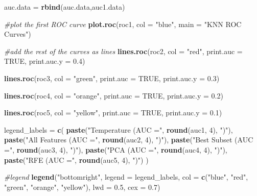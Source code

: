 \documentclass[
]{article}
\newenvironment{Shaded}{\begin{snugshade}}{\end{snugshade}}
\newcommand{\AttributeTok}[1]{\textcolor[rgb]{0.13,0.29,0.53}{#1}}
\newcommand{\CommentTok}[1]{\textcolor[rgb]{0.56,0.35,0.01}{\textit{#1}}}
\newcommand{\ConstantTok}[1]{\textcolor[rgb]{0.56,0.35,0.01}{#1}}
\newcommand{\DecValTok}[1]{\textcolor[rgb]{0.00,0.00,0.81}{#1}}
\newcommand{\FloatTok}[1]{\textcolor[rgb]{0.00,0.00,0.81}{#1}}
\newcommand{\FunctionTok}[1]{\textcolor[rgb]{0.13,0.29,0.53}{\textbf{#1}}}
\newcommand{\NormalTok}[1]{#1}
\newcommand{\OtherTok}[1]{\textcolor[rgb]{0.56,0.35,0.01}{#1}}
\newcommand{\StringTok}[1]{\textcolor[rgb]{0.31,0.60,0.02}{#1}}
\begin{document}
\begin{Shaded}
\begin{Highlighting}[]
\NormalTok{auc.data }\OtherTok{=} \FunctionTok{rbind}\NormalTok{(auc.data,auc1.data)}

\CommentTok{\#plot the first ROC curve}
\FunctionTok{plot.roc}\NormalTok{(roc1, }\AttributeTok{col =} \StringTok{"blue"}\NormalTok{, }\AttributeTok{main =} \StringTok{"KNN ROC Curves"}\NormalTok{)}

\CommentTok{\#add the rest of the curves as lines}
\FunctionTok{lines.roc}\NormalTok{(roc2, }\AttributeTok{col =} \StringTok{"red"}\NormalTok{, }\AttributeTok{print.auc =} \ConstantTok{TRUE}\NormalTok{, }\AttributeTok{print.auc.y =} \FloatTok{0.4}\NormalTok{)}

\FunctionTok{lines.roc}\NormalTok{(roc3, }\AttributeTok{col =} \StringTok{"green"}\NormalTok{, }\AttributeTok{print.auc =} \ConstantTok{TRUE}\NormalTok{, }\AttributeTok{print.auc.y =} \FloatTok{0.3}\NormalTok{)}

\FunctionTok{lines.roc}\NormalTok{(roc4, }\AttributeTok{col =} \StringTok{"orange"}\NormalTok{, }\AttributeTok{print.auc =} \ConstantTok{TRUE}\NormalTok{, }\AttributeTok{print.auc.y =} \FloatTok{0.2}\NormalTok{)}

\FunctionTok{lines.roc}\NormalTok{(roc5, }\AttributeTok{col =} \StringTok{"yellow"}\NormalTok{, }\AttributeTok{print.auc =} \ConstantTok{TRUE}\NormalTok{, }\AttributeTok{print.auc.y =} \FloatTok{0.1}\NormalTok{)}

\NormalTok{legend\_labels }\OtherTok{=} \FunctionTok{c}\NormalTok{(}
  \FunctionTok{paste}\NormalTok{(}\StringTok{"Temperature (AUC ="}\NormalTok{, }\FunctionTok{round}\NormalTok{(auc1, }\DecValTok{4}\NormalTok{), }\StringTok{")"}\NormalTok{),}
  \FunctionTok{paste}\NormalTok{(}\StringTok{"All Features (AUC ="}\NormalTok{, }\FunctionTok{round}\NormalTok{(auc2, }\DecValTok{4}\NormalTok{), }\StringTok{")"}\NormalTok{),}
  \FunctionTok{paste}\NormalTok{(}\StringTok{"Best Subset (AUC ="}\NormalTok{, }\FunctionTok{round}\NormalTok{(auc3, }\DecValTok{4}\NormalTok{), }\StringTok{")"}\NormalTok{),}
  \FunctionTok{paste}\NormalTok{(}\StringTok{"PCA (AUC ="}\NormalTok{, }\FunctionTok{round}\NormalTok{(auc4, }\DecValTok{4}\NormalTok{), }\StringTok{")"}\NormalTok{),}
  \FunctionTok{paste}\NormalTok{(}\StringTok{"RFE (AUC ="}\NormalTok{, }\FunctionTok{round}\NormalTok{(auc5, }\DecValTok{4}\NormalTok{), }\StringTok{")"}\NormalTok{)}
\NormalTok{)}

\CommentTok{\#legend}
\FunctionTok{legend}\NormalTok{(}\StringTok{"bottomright"}\NormalTok{, }\AttributeTok{legend =}\NormalTok{ legend\_labels, }\AttributeTok{col =} \FunctionTok{c}\NormalTok{(}\StringTok{"blue"}\NormalTok{, }\StringTok{"red"}\NormalTok{, }\StringTok{"green"}\NormalTok{, }\StringTok{"orange"}\NormalTok{, }\StringTok{"yellow"}\NormalTok{), }\AttributeTok{lwd =} \FloatTok{0.5}\NormalTok{, }\AttributeTok{cex =} \FloatTok{0.7}\NormalTok{)}
\end{Highlighting}
\end{Shaded}
\end{document}
